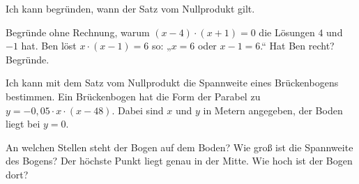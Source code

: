 \begin{aufgabe}{Ich kann begründen, wann der Satz vom Nullprodukt gilt.}
\begin{teile}
\teil Begründe ohne Rechnung, warum $(x - 4)\cdot(x + 1) = 0$ die Lösungen $4$ und $-1$ hat.
\teil Ben löst $x\cdot(x - 1) = 6$ so: „$x = 6$ oder $x - 1 = 6$.“ Hat Ben recht? Begründe.
\end{teile}
\end{aufgabe}

\begin{aufgabe}{Ich kann mit dem Satz vom Nullprodukt die Spannweite eines Brückenbogens bestimmen. Ein Brückenbogen hat die Form der Parabel zu $y = -0{,}05\cdot x\cdot(x - 48)$. Dabei sind $x$ und $y$ in Metern angegeben, der Boden liegt bei $y = 0$.}
\begin{teile}
\teil An welchen Stellen steht der Bogen auf dem Boden? Wie groß ist die Spannweite des Bogens?
\teil Der höchste Punkt liegt genau in der Mitte. Wie hoch ist der Bogen dort?
\end{teile}
\end{aufgabe}
